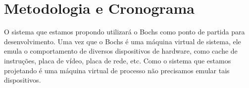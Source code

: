 \documentclass[11pt,twoside]{article}
\begin{document}
\section{Metodologia e Cronograma}
%

O sistema que estamos propondo utilizará o Bochs como ponto de partida
para desenvolvimento. Uma vez que o Bochs é uma máquina virtual de sistema,
ele emula o comportamento de diversos dispositivos de hardware, como
cache de instruções, placa de vídeo, placa de rede, etc. Como o sistema
que estamos projetando é uma máquina virtual de processo não precisamos
emular tais dispositivos. 


\end{document}
